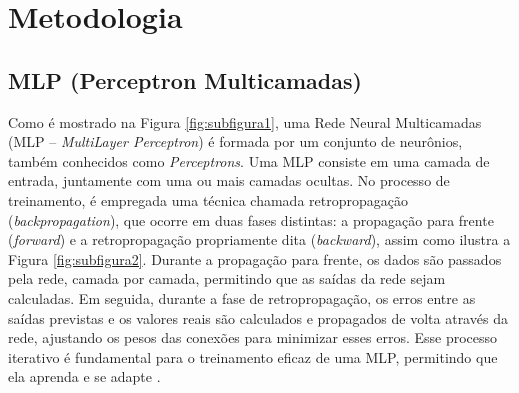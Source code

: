\chapter{Metodologia}
\label{chap:metodologia}

\section{MLP (Perceptron Multicamadas)}

Como é mostrado na Figura \ref{fig:subfigura1}, uma Rede Neural Multicamadas (MLP – \textit{MultiLayer Perceptron})
é formada por um conjunto de neurônios, também conhecidos como
\textit{Perceptrons}. Uma MLP consiste em uma camada de entrada, juntamente com uma ou mais camadas ocultas.
No processo de treinamento, é empregada uma técnica chamada retropropagação (\textit{backpropagation}), que
ocorre em duas fases distintas: a propagação para frente (\textit{forward}) e a retropropagação propriamente
dita (\textit{backward}), assim como ilustra a Figura \ref{fig:subfigura2}. Durante a propagação para frente, os dados são passados pela rede, camada por camada,
permitindo que as saídas da rede sejam calculadas. Em seguida, durante a fase de retropropagação, os
erros entre as saídas previstas e os valores reais são calculados e propagados de volta através da rede,
ajustando os pesos das conexões para minimizar esses erros. Esse processo iterativo é fundamental para o
treinamento eficaz de uma MLP, permitindo que ela aprenda e se adapte \cite{su12114776}.  


